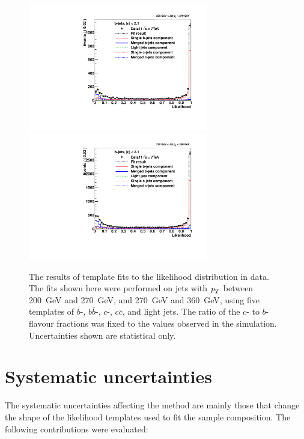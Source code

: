 \begin{figure}[tp]
\centering
\includegraphics[width=0.7\textwidth]{FIGS/Fits/LikelihoodFit_3param_ETAFull_Bin5.pdf}
\includegraphics[width=0.7\textwidth]{FIGS/Fits/LikelihoodFit_3param_ETAFull_Bin6.pdf}
\caption{The results of template fits to the likelihood distribution in data. The fits shown here were performed on jets with ${\emph{p}_{T}}$ between  200~GeV and 270~GeV, and 270~GeV and 360~GeV, using five templates of $b$-, $b\bar{b}$-, $c$-, $c\bar{c}$, and light jets.  The ratio of the $c$- to $b$-flavour fractions was fixed to the values observed in the simulation.  Uncertainties shown are statistical only.}
\label{fig:fittemplates2}
\end{figure}


\section{Systematic uncertainties}\label{sec:FractionSystematics}

The systematic uncertainties affecting the method are mainly those that change the shape of the likelihood templates used to fit the sample composition. The following contributions were evaluated:

